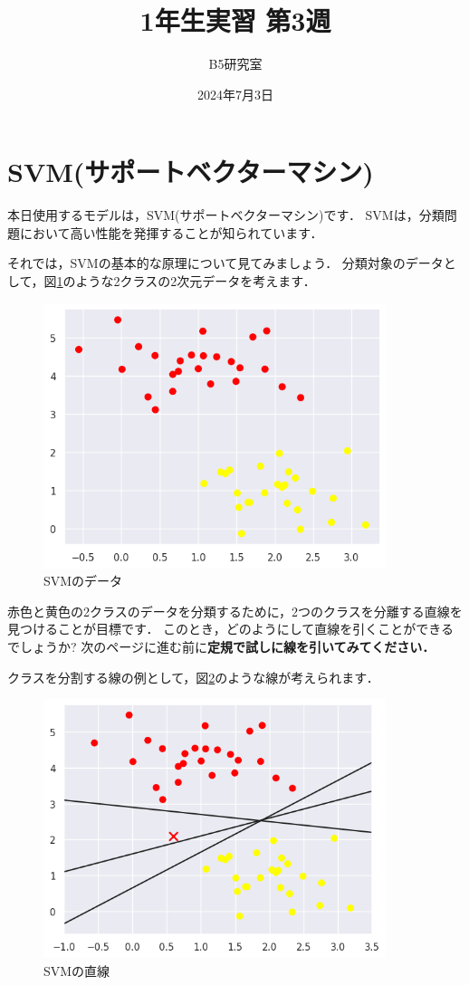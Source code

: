 \documentclass{jarticle}
\begin{document}
\title{1年生実習 第3週}
\author{B5研究室}
\date{2024年7月3日}
\maketitle

\section{SVM(サポートベクターマシン)}
本日使用するモデルは，SVM(サポートベクターマシン)です．
SVMは，分類問題において高い性能を発揮することが知られています．

それでは，SVMの基本的な原理について見てみましょう．
分類対象のデータとして，図\ref{fig:svm_data}のような2クラスの2次元データを考えます．

\begin{figure}[H]
  \centering
  \includegraphics[width=10cm]{fig/svm_data.png}
  \caption{SVMのデータ}
  \label{fig:svm_data}
\end{figure}

赤色と黄色の2クラスのデータを分類するために，2つのクラスを分離する直線を見つけることが目標です．
このとき，どのようにして直線を引くことができるでしょうか?
次のページに進む前に\textbf{定規で試しに線を引いてみてください．}
\newpage

クラスを分割する線の例として，図\ref{fig:svm_lines}のような線が考えられます．

\begin{figure}[H]
  \centering
  \includegraphics[width=10cm]{fig/svm_lines.png}
  \caption{SVMの直線}
  \label{fig:svm_lines}
\end{figure}
\end{document}
